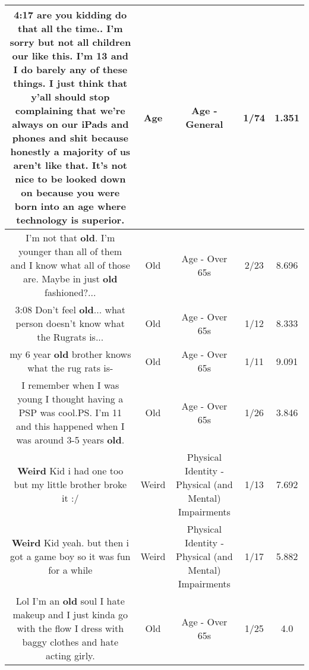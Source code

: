 \documentclass[11pt]{article}
\newlength\mylength
\begin{document}
\begin{center}
\begin{longtable}{|C{.65\mylength}|C{.30\mylength}|C{.12\mylength}|C{.12\mylength}|C{.12\mylength}|}
  \small 4:17 are you kidding do that all the time.. I'm sorry but not all children our like this. I'm 13 and I do barely any of these things. I just think that y'all should stop complaining that we're always on our iPads and phones and shit because honestly a majority of us aren't like that. It's not nice to be looked down on because you were born into an \textbf{age} where technology is superior.\normalsize   & Age & Age - General & 1/74 & 1.351 \\  \hline
  \small I'm not that \textbf{old}. I'm younger than all of them and I know what all of those are. Maybe in just \textbf{old} fashioned?...\normalsize   & Old & Age - Over 65s & 2/23 & 8.696 \\  \hline
  \small 3:08 Don't feel \textbf{old}... what person doesn't know what the Rugrats is...\normalsize   & Old & Age - Over 65s & 1/12 & 8.333 \\  \hline
  \small my 6 year \textbf{old} brother knows what the rug rats is-\normalsize   & Old & Age - Over 65s & 1/11 & 9.091 \\  \hline
  \small I remember when I was young I thought having a PSP was cool.PS. I'm 11 and this happened when I was around 3-5 years \textbf{old}.\normalsize   & Old & Age - Over 65s & 1/26 & 3.846 \\  \hline
  \small \@\textbf{Weird} Kid i had one too but my little brother broke it :/\normalsize   & Weird & Physical Identity - Physical (and Mental) Impairments & 1/13 & 7.692 \\  \hline
  \small \@\textbf{Weird} Kid yeah. but then i got a game boy so it was fun for a while\normalsize   & Weird & Physical Identity - Physical (and Mental) Impairments & 1/17 & 5.882 \\  \hline
  \small Lol I'm an \textbf{old} soul I hate makeup and I just kinda go with the flow I dress with baggy clothes and hate acting girly.\normalsize   & Old & Age - Over 65s & 1/25 & 4.0 \\  \hline

\end{longtable}
\end{center}
\end{document}
